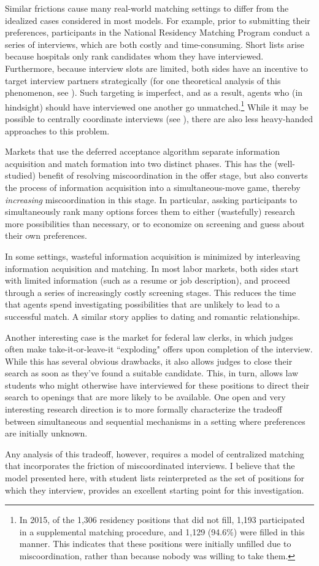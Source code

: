 \documentclass[11pt, oneside]{article}   	%
\begin{document}
Similar frictions cause many real-world matching settings to differ from the idealized cases considered in most models. For example, prior to submitting their preferences, participants in the National Residency Matching Program conduct a series of interviews, which are both costly and time-consuming. Short lists arise because hospitals only rank candidates whom they have interviewed. Furthermore, because interview slots are limited, both sides have an incentive to target interview partners strategically (for one theoretical analysis of this phenomenon, see \cite{kadam_2015}). Such targeting is imperfect, and as a result, agents who (in hindsight) should have interviewed one another go unmatched.\footnote{In 2015, of the 1,306 residency positions that did not fill, 1,193 participated in a supplemental matching procedure, and 1,129 (94.6\%) were filled in this manner. This indicates that these positions were initially unfilled due to miscoordination, rather than because nobody was willing to take them.} While it may be possible to centrally coordinate interviews (see \citet{lee-schwarz_2012}), there are also less heavy-handed approaches to this problem.

Markets that use the deferred acceptance algorithm separate information acquisition and match formation into two distinct phases. This has the (well-studied) benefit of resolving miscoordination in the offer stage, but also converts the process of information acquisition into a simultaneous-move game, thereby \emph{increasing} miscoordination in this stage. In particular, assking participants to simultaneously rank many options forces them to either (wastefully) research more possibilities than necessary, or to economize on screening and guess about their own preferences.

In some settings, wasteful information acquisition is minimized by interleaving information acquisition and matching. In most labor markets, both sides start with limited information (such as a resume or job description), and proceed through a series of increasingly costly screening stages.  This reduces the time that agents spend investigating possibilities that are unlikely to lead to a successful match. A similar story applies to dating and romantic relationships.

Another interesting case is the market for federal law clerks, in which judges often make take-it-or-leave-it ``exploding" offers upon completion of the interview. While this has several obvious drawbacks, it also allows judges to close their search as soon as they've found a suitable candidate. This, in turn, allows law students who might otherwise have interviewed for these positions to direct their search to openings that are more likely to be available. One open and very interesting research direction is to more formally characterize the tradeoff between simultaneous and sequential mechanisms in a setting where preferences are initially unknown.

Any analysis of this tradeoff, however, requires a model of centralized matching that incorporates the friction of miscoordinated interviews. I believe that the model presented here, with student lists reinterpreted as the set of positions for which they interview, provides an excellent starting point for this investigation.
\end{document}
